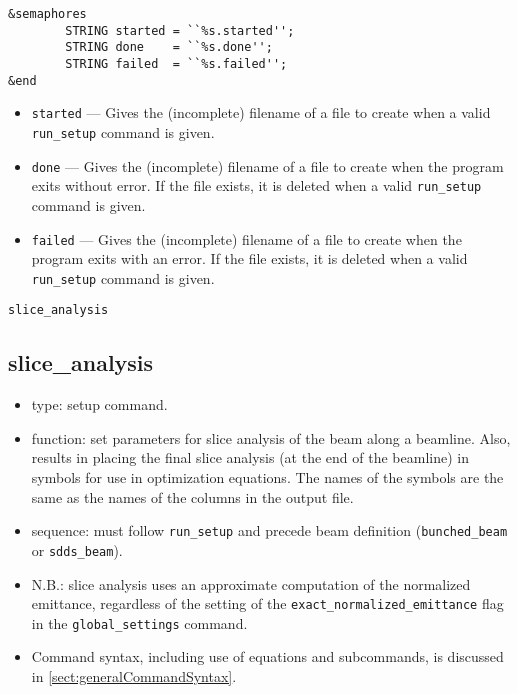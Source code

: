 \documentclass[11pt]{article}
\begin{document}
\begin{verbatim}
&semaphores
        STRING started = ``%s.started'';
        STRING done    = ``%s.done'';
        STRING failed  = ``%s.failed'';
&end
\end{verbatim}

\begin{itemize}
\item {\tt started} --- Gives the (incomplete) filename of a file to create when a valid
        {\tt run\_setup} command is given.
\item {\tt done} --- Gives the (incomplete) filename of a file to create when the program
        exits without error.  If the file exists, it is deleted when a valid {\tt run\_setup}
        command is given.
\item {\tt failed} --- Gives the (incomplete) filename of a file to create when the program
        exits with an error.  If the file exists, it is deleted when a valid {\tt run\_setup}
        command is given.
\end{itemize}

\newpage
\begin{center}{\Large\verb|slice_analysis|}\end{center}
\subsection{slice\_analysis \label{subsec:sliceanalysis}}

\begin{itemize}
\item type: setup command.
\item function: set parameters for slice analysis of the beam along a
	beamline.  Also, results in placing the final slice analysis
        (at the end of the beamline) in symbols for use in optimization
        equations.  The names of the symbols are the same as the names
        of the columns in the output file.
\item sequence: must follow \verb|run_setup| and precede beam definition (\verb|bunched_beam| or \verb|sdds_beam|).
\item N.B.: slice analysis uses an approximate computation of the normalized emittance, regardless of the
  setting of the \verb|exact_normalized_emittance| flag in the \verb|global_settings| command.
\item Command syntax, including use of equations and subcommands, is discussed in \ref{sect:generalCommandSyntax}.
\end{itemize}
\end{document}
